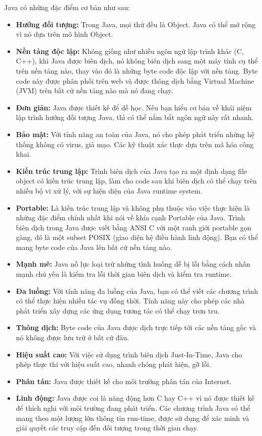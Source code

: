 Java có những đặc điểm cơ bản như sau:
\begin{itemize}
    \item \textbf{Hướng đối tượng:} Trong Java, mọi thứ đều là Object. Java có thể mở rộng vì nó dựa trên mô hình Object.
    \item \textbf{Nền tảng độc lập:} Không giống như nhiều ngôn ngữ lập trình khác (C, C++), khi Java được biên dịch, nó không biên dịch sang một máy tính cụ thể trên nền tảng nào, thay vào đó là những byte code độc lập với nền tảng. Byte code này được phân phối trên web và được thông dịch bằng Virtual Machine (JVM) trên bất cứ nền tảng nào mà nó đang chạy.
    \item \textbf{Đơn giản:} Java được thiết kế để dễ học. Nếu bạn hiểu cơ bản về khái niệm lập trình hướng đối tượng Java, thì có thể nắm bắt ngôn ngữ này rất nhanh.
    \item \textbf{Bảo mật:} Với tính năng an toàn của Java, nó cho phép phát triển những hệ thống không có virus, giả mạo. Các kỹ thuật xác thực dựa trên mã hóa công khai.
    \item \textbf{Kiến trúc trung lập:} Trình biên dịch của Java tạo ra một định dạng file object có kiến trúc trung lập, làm cho code sau khi biên dịch có thể chạy trên nhiều bộ vi xử lý, với sự hiện diện của Java runtime system.
    \item \textbf{Portable:} Là kiến trúc trung lập và không phụ thuộc vào việc thực hiện là những đặc điểm chính nhất khi nói về khía cạnh Portable của Java. Trình biên dịch trong Java được viết bằng ANSI C với một ranh giới portable gọn gàng, đó là một subset POSIX (giao diện hệ điều hành linh động). Bạn có thể mang byte code của Java lên bất cứ nền tảng nào.
    \item \textbf{Mạnh mẽ:} Java nỗ lực loại trừ những tình huống dễ bị lỗi bằng cách nhấn mạnh chủ yếu là kiểm tra lỗi thời gian biên dịch và kiểm tra runtime.
    \item \textbf{Đa luồng:} Với tính năng đa luồng của Java, bạn có thể viết các chương trình có thể thực hiện nhiều tác vụ đồng thời. Tính năng này cho phép các nhà phát triển xây dựng các ứng dụng tương tác có thể chạy trơn tru.
    \item \textbf{Thông dịch:} Byte code của Java được dịch trực tiếp tới các nền tảng gốc và nó không được lưu trữ ở bất cứ đâu. 
    \item \textbf{Hiệu suất cao:} Với việc sử dụng trình biên dịch Just-In-Time, Java cho phép thực thi với hiệu suất cao, nhanh chóng phát hiện, gỡ lỗi.
    \item \textbf{Phân tán:} Java được thiết kế cho môi trường phân tán của Internet.
    \item \textbf{Linh động:} Java được coi là năng động hơn C hay C++ vì nó được thiết kế để thích nghi với môi trường đang phát triển. Các chương trình Java có thể mang theo một lượng lớn thông tin run-time, được sử dụng để xác minh và giải quyết các truy cập đến đối tượng trong thời gian chạy.
\end{itemize}

